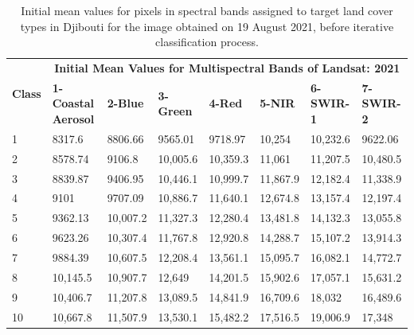 \documentclass[jimaging,article,accept,pdftex,moreauthors]{Definitions/mdpi}
\begin{document}
\vspace{-6pt}
\begin{table}[H]\footnotesize
 \caption{Initial mean values for pixels in spectral bands assigned to target land cover types in Djibouti for the image obtained on 19 August 2021, before iterative classification process.}
  \centering
  \begin{tabularx}{\textwidth}{p{0.7cm}p{2.5cm}p{1.0cm}p{1.3cm}p{1.0cm}p{1.0cm}p{1.5cm}p{1.5cm}}
  \toprule
  \multirow{2}{*}{\textbf{Class}} & \multicolumn{7}{c}{\textbf{Initial Mean Values for Multispectral Bands of Landsat: 2021}} \\
     & \textbf{1-Coastal Aerosol} & \textbf{2-Blue} & \textbf{3-Green} & \textbf{4-Red} &\textbf{ 5-NIR} & \textbf{6-SWIR-1} & \textbf{7-SWIR-2} \\
    \midrule
    1 & 8317.6 & 8806.66 & 9565.01 & 9718.97 & 10,254 & 10,232.6 & 9622.06 \\
    2 & 8578.74 & 9106.8 & 10,005.6 & 10,359.3 & 11,061 & 11,207.5 & 10,480.5 \\
    3 & 8839.87 & 9406.95 & 10,446.1 & 10,999.7 & 11,867.9 & 12,182.4 & 11,338.9 \\
    4 & 9101 & 9707.09 & 10,886.7 & 11,640.1 & 12,674.8 & 13,157.4 & 12,197.4 \\
    5 & 9362.13 &10,007.2 & 11,327.3 & 12,280.4 & 13,481.8 & 14,132.3 & 13,055.8 \\
    6 & 9623.26 & 10,307.4 & 11,767.8 & 12,920.8 & 14,288.7 & 15,107.2 & 13,914.3 \\
    7 & 9884.39 & 10,607.5 & 12,208.4 & 13,561.1 & 15,095.7 & 16,082.1 & 14,772.7 \\
    8 & 10,145.5 & 10,907.7 & 12,649 & 14,201.5 & 15,902.6 & 17,057.1 & 15,631.2 \\
    9 & 10,406.7 & 11,207.8 & 13,089.5 & 14,841.9 & 16,709.6 & 18,032 & 16,489.6 \\
    10 & 10,667.8 & 11,507.9 & 13,530.1 & 15,482.2 & 17,516.5 & 19,006.9 & 17,348 \\
\bottomrule
\end{tabularx}
 
  \label{tabA3} 
\end{table}
\end{document}
